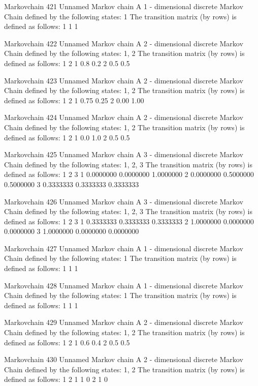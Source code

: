 \documentclass[
  nojss]{jss}
\begin{document}
\begin{CodeChunk}
\begin{CodeOutput}
Markovchain  421 
Unnamed Markov chain 
 A  1 - dimensional discrete Markov Chain defined by the following states: 
 1 
 The transition matrix  (by rows)  is defined as follows: 
  1
1 1

Markovchain  422 
Unnamed Markov chain 
 A  2 - dimensional discrete Markov Chain defined by the following states: 
 1, 2 
 The transition matrix  (by rows)  is defined as follows: 
    1   2
1 0.8 0.2
2 0.5 0.5

Markovchain  423 
Unnamed Markov chain 
 A  2 - dimensional discrete Markov Chain defined by the following states: 
 1, 2 
 The transition matrix  (by rows)  is defined as follows: 
     1    2
1 0.75 0.25
2 0.00 1.00

Markovchain  424 
Unnamed Markov chain 
 A  2 - dimensional discrete Markov Chain defined by the following states: 
 1, 2 
 The transition matrix  (by rows)  is defined as follows: 
    1   2
1 0.0 1.0
2 0.5 0.5

Markovchain  425 
Unnamed Markov chain 
 A  3 - dimensional discrete Markov Chain defined by the following states: 
 1, 2, 3 
 The transition matrix  (by rows)  is defined as follows: 
          1         2         3
1 0.0000000 0.0000000 1.0000000
2 0.0000000 0.5000000 0.5000000
3 0.3333333 0.3333333 0.3333333

Markovchain  426 
Unnamed Markov chain 
 A  3 - dimensional discrete Markov Chain defined by the following states: 
 1, 2, 3 
 The transition matrix  (by rows)  is defined as follows: 
          1         2         3
1 0.3333333 0.3333333 0.3333333
2 1.0000000 0.0000000 0.0000000
3 1.0000000 0.0000000 0.0000000

Markovchain  427 
Unnamed Markov chain 
 A  1 - dimensional discrete Markov Chain defined by the following states: 
 1 
 The transition matrix  (by rows)  is defined as follows: 
  1
1 1

Markovchain  428 
Unnamed Markov chain 
 A  1 - dimensional discrete Markov Chain defined by the following states: 
 1 
 The transition matrix  (by rows)  is defined as follows: 
  1
1 1

Markovchain  429 
Unnamed Markov chain 
 A  2 - dimensional discrete Markov Chain defined by the following states: 
 1, 2 
 The transition matrix  (by rows)  is defined as follows: 
    1   2
1 0.6 0.4
2 0.5 0.5

Markovchain  430 
Unnamed Markov chain 
 A  2 - dimensional discrete Markov Chain defined by the following states: 
 1, 2 
 The transition matrix  (by rows)  is defined as follows: 
  1 2
1 1 0
2 1 0


\end{CodeOutput}
\end{CodeChunk}
\end{document}

